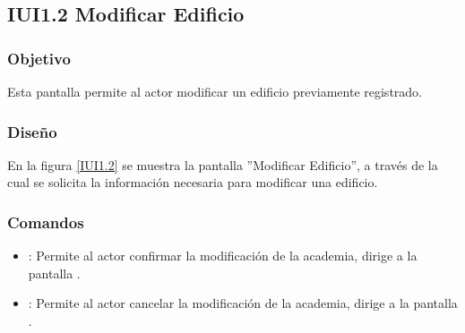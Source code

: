 \subsection{IUI1.2 Modificar Edificio}

\subsubsection{Objetivo}
	Esta pantalla permite al actor modificar un edificio previamente registrado.

\subsubsection{Diseño}
	En la figura \ref{IUI1.2} se muestra la pantalla ''Modificar Edificio'', a través de la cual se solicita la información necesaria para modificar una edificio.


\subsubsection{Comandos}
\begin{itemize}
	\item {}: Permite al actor confirmar la modificación de la academia, dirige a la pantalla .
	
	\item {}: Permite al actor cancelar la modificación de la academia, dirige a la pantalla .
\end{itemize}
